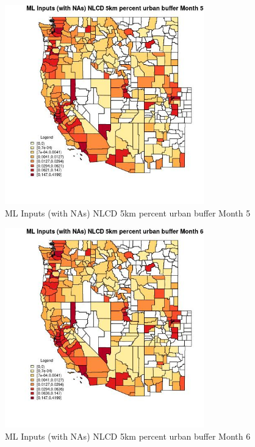\begin{figure} 
\centering  
\includegraphics[width=0.77\textwidth]{Code_Outputs/Report_ML_input_PM25_Step4_part_e_de_duplicated_aves_compiled_2019-05-21wNAs_CountyNLCD_5km_percent_urban_buffermedianMonth5.jpg} 
\caption{\label{fig:Report_ML_input_PM25_Step4_part_e_de_duplicated_aves_compiled_2019-05-21wNAsCountyNLCD_5km_percent_urban_buffermedianMonth5}ML Inputs (with NAs) NLCD 5km percent urban buffer Month 5} 
\end{figure} 
 

\begin{figure} 
\centering  
\includegraphics[width=0.77\textwidth]{Code_Outputs/Report_ML_input_PM25_Step4_part_e_de_duplicated_aves_compiled_2019-05-21wNAs_CountyNLCD_5km_percent_urban_buffermedianMonth6.jpg} 
\caption{\label{fig:Report_ML_input_PM25_Step4_part_e_de_duplicated_aves_compiled_2019-05-21wNAsCountyNLCD_5km_percent_urban_buffermedianMonth6}ML Inputs (with NAs) NLCD 5km percent urban buffer Month 6} 
\end{figure} 
 

